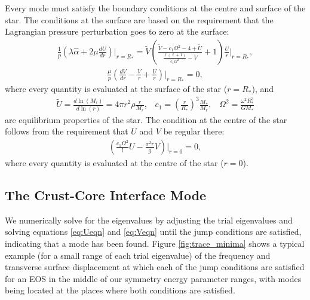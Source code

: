 \documentclass[fleqn,usenatbib]{mnras}
\begin{document}
Every mode must satisfy the boundary conditions at the centre and surface of the star. The conditions at the surface are based on the requirement that the Lagrangian pressure perturbation goes to zero at the surface:
\begin{align}
\frac{1}{p}\left(\lambda\hat{\alpha}+2\mu\frac{dU}{dr}\right)\biggr\rvert_{r=R_{*}}=\tilde{V}\left(\frac{\tilde{V}-c_1\Omega^2-4+\tilde{U}}{\frac{\ell(\ell+1)}{c_1\Omega^2}-\tilde{V}}+1\right)\frac{U}{r}\biggr\rvert_{r=R_{*}},
\label{eq:surface_boundary_modified_1}
\end{align}
\begin{align}
\frac{\mu}{p}\left(\frac{dV}{dr}-\frac{V}{r}+\frac{U}{r}\right)\biggr\rvert_{r=R_{*}}=0,
\label{eq:surface_boundary_modified_2}
\end{align}
\noindent where every quantity is evaluated at the surface of the star ($r=R_*$), and 
\begin{align}\nonumber
\tilde{U}=\frac{d\ln\left(M_r\right)}{d\ln\left(r\right)}=4\pi r^2\rho\frac{r}{M_r},\;\;\;c_1=\left(\frac{r}{R_*}\right)^3\frac{M_*}{M_r},\;\;\;\Omega^2=\frac{\omega^2R_*^3}{GM_*}
\end{align}
\noindent are equilibrium properties of the star. The condition at the centre of the star follows from the requirement that $U$ and $V$ be regular there:
\begin{align}
\left(\frac{c_1\Omega^2}{l}U-\frac{\sigma^2r}{g}V\right)\biggr\rvert_{r=0}=0,
\label{eq:core_condition}
\end{align}
\noindent where every quantity is evaluated at the centre of the star ($r=0$).











\subsection{The Crust-Core Interface Mode}
\hspace{\parindent}We numerically solve for the eigenvalues by adjusting the trial eigenvalues and solving equations \ref{eq:Ueqn} and \ref{eq:Veqn} until the jump conditions are satisfied, indicating that a mode has been found. Figure \ref{fig:trace_minima} shows a typical example (for a small range of each trial eigenvalue) of the frequency and transverse surface displacement at which each of the jump conditions are satisfied for an EOS in the middle of our symmetry energy parameter ranges, with modes being located at the places where both conditions are satisfied.
\end{document}
